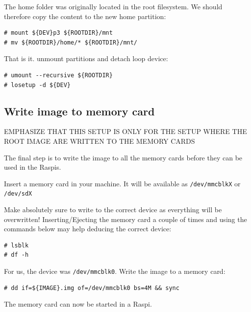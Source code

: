 The home folder was originally located in the root filesystem. We should
therefore copy the content to the new home partition:
\begin{lstlisting}[]
# mount ${DEV}p3 ${ROOTDIR}/mnt
# mv ${ROOTDIR}/home/* ${ROOTDIR}/mnt/
\end{lstlisting}
\FloatBarrier
\vspace{-5mm}

That is it. unmount partitions and detach loop device:
\begin{lstlisting}[]
# umount --recursive ${ROOTDIR}
# losetup -d ${DEV}
\end{lstlisting}
\FloatBarrier
\vspace{-5mm}

\subsection{Write image to memory card}


EMPHASIZE THAT THIS SETUP IS ONLY FOR THE SETUP WHERE THE ROOT IMAGE ARE
WRITTEN TO THE MEMORY CARDS

The final step is to write the image to all the memory cards before they can
be used in the \ac{Raspi}s.



Insert a memory card in your machine. It will be available as
\texttt{/dev/mmcblkX} or \texttt{/dev/sdX}

Make absolutely sure to write to the correct device as everything will be 
overwritten!
Inserting/Ejecting the memory card a couple of times and using the commands
below may help deducing the correct device:

\begin{lstlisting}[]
# lsblk
# df -h
\end{lstlisting}
\FloatBarrier
\vspace{-5mm}

For us, the device was \texttt{/dev/mmcblk0}. Write the image to a memory card:
\begin{lstlisting}[]
# dd if=${IMAGE}.img of=/dev/mmcblk0 bs=4M && sync
\end{lstlisting}
\FloatBarrier
\vspace{-5mm}

The memory card can now be started in a \ac{Raspi}.

